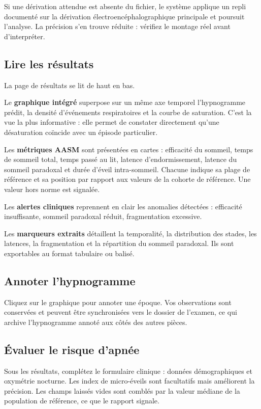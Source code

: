 \noindent
Si une dérivation attendue est absente du fichier, le système applique un repli
documenté sur la dérivation électroencéphalographique principale et poursuit l'analyse.
La précision s'en trouve réduite : vérifiez le montage réel avant d'interpréter.

\subsection*{Lire les résultats}

La page de résultats se lit de haut en bas.

Le \textbf{graphique intégré} superpose sur un même axe temporel l'hypnogramme prédit,
la densité d'événements respiratoires et la courbe de saturation. C'est la vue la plus
informative : elle permet de constater directement qu'une désaturation coïncide avec un
épisode particulier.

Les \textbf{métriques AASM} sont présentées en cartes : efficacité du sommeil, temps de
sommeil total, temps passé au lit, latence d'endormissement, latence du sommeil
paradoxal et durée d'éveil intra-sommeil. Chacune indique sa plage de référence et sa
position par rapport aux valeurs de la cohorte de référence. Une valeur hors norme est
signalée.

Les \textbf{alertes cliniques} reprennent en clair les anomalies détectées : efficacité
insuffisante, sommeil paradoxal réduit, fragmentation excessive.

Les \textbf{marqueurs extraits} détaillent la temporalité, la distribution des stades,
les latences, la fragmentation et la répartition du sommeil paradoxal. Ils sont
exportables au format tabulaire ou balisé.

\subsection*{Annoter l'hypnogramme}

Cliquez sur le graphique pour annoter une époque. Vos observations sont conservées et
peuvent être synchronisées vers le dossier de l'examen, ce qui archive l'hypnogramme
annoté aux côtés des autres pièces.

\subsection*{Évaluer le risque d'apnée}

Sous les résultats, complétez le formulaire clinique : données démographiques et
oxymétrie nocturne. Les index de micro-éveils sont facultatifs mais améliorent la
précision. Les champs laissés vides sont comblés par la valeur médiane de la population
de référence, ce que le rapport signale.


